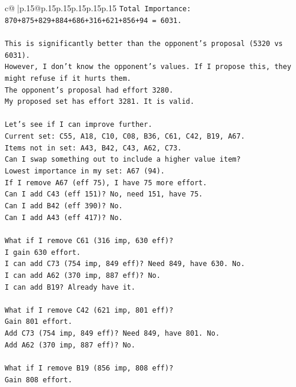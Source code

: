 \documentclass{article}
\begin{document}
{\begin{supertabular}{c@{$\;$}|p{.15\linewidth}@{}p{.15\linewidth}p{.15\linewidth}p{.15\linewidth}p{.15\linewidth}p{.15\linewidth}}
{{{\texttt{Total Importance: 870+875+829+884+686+316+621+856+94 = 6031.} \\
\\ 
\texttt{This is significantly better than the opponent's proposal (5320 vs 6031).} \\
\texttt{However, I don't know the opponent's values. If I propose this, they might refuse if it hurts them.} \\
\texttt{The opponent's proposal had effort 3280.} \\
\texttt{My proposed set has effort 3281. It is valid.} \\
\\ 
\texttt{Let's see if I can improve further.} \\
\texttt{Current set: C55, A18, C10, C08, B36, C61, C42, B19, A67.} \\
\texttt{Items not in set: A43, B42, C43, A62, C73.} \\
\texttt{Can I swap something out to include a higher value item?} \\
\texttt{Lowest importance in my set: A67 (94).} \\
\texttt{If I remove A67 (eff 75), I have 75 more effort.} \\
\texttt{Can I add C43 (eff 151)? No, need 151, have 75.} \\
\texttt{Can I add B42 (eff 390)? No.} \\
\texttt{Can I add A43 (eff 417)? No.} \\
\\ 
\texttt{What if I remove C61 (316 imp, 630 eff)?} \\
\texttt{I gain 630 effort.} \\
\texttt{I can add C73 (754 imp, 849 eff)? Need 849, have 630. No.} \\
\texttt{I can add A62 (370 imp, 887 eff)? No.} \\
\texttt{I can add B19? Already have it.} \\
\\ 
\texttt{What if I remove C42 (621 imp, 801 eff)?} \\
\texttt{Gain 801 effort.} \\
\texttt{Add C73 (754 imp, 849 eff)? Need 849, have 801. No.} \\
\texttt{Add A62 (370 imp, 887 eff)? No.} \\
\\ 
\texttt{What if I remove B19 (856 imp, 808 eff)?} \\
\texttt{Gain 808 effort.} \\
}}}
\end{supertabular}}
\end{document}
